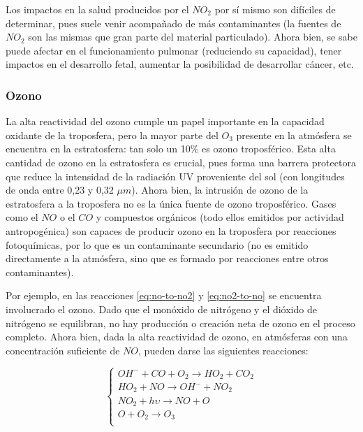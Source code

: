 \documentclass[12pt]{article}
\begin{document}
Los impactos en la salud producidos por el $NO_{2}$ por sí mismo son difíciles de determinar, pues suele venir acompañado de más contaminantes (la fuentes de $NO_{2}$ son las mismas que gran parte del material particulado). Ahora bien, se sabe puede afectar en el funcionamiento pulmonar (reduciendo su capacidad), tener impactos en el desarrollo fetal, aumentar la posibilidad de desarrollar cáncer, etc.

\subsubsection{Ozono}

La alta reactividad del ozono cumple un papel importante en la capacidad oxidante de la troposfera, pero la mayor parte del $O_{3}$ presente en la atmósfera se encuentra en la estratosfera: tan solo un 10\% es ozono troposférico. Esta alta cantidad de ozono en la estratosfera es crucial, pues forma una barrera protectora que reduce la intensidad de la radiación UV proveniente del sol (con longitudes de onda entre 0,23 y 0,32 $\mu m$).  Ahora bien, la intrusión de ozono de la estratosfera a la troposfera no es la única fuente de ozono troposférico. Gases como el $NO$ o el $CO$ y compuestos orgánicos (todo ellos emitidos por actividad antropogénica) son capaces de producir ozono en la troposfera por reacciones fotoquímicas, por lo que es un contaminante secundario (no es emitido directamente a la atmósfera, sino que es formado por reacciones entre otros contaminantes).

Por ejemplo, en las reacciones \ref{eq:no-to-no2} y \ref{eq:no2-to-no} se encuentra involucrado el ozono. Dado que el monóxido de nitrógeno y el dióxido de nitrógeno se equilibran, no hay producción o creación neta de ozono en el proceso completo. Ahora bien, dada la alta reactividad de ozono, en atmósferas con una concentración suficiente de $NO$, pueden darse las siguientes reacciones:

\begin{equation}
\begin{cases}
OH^{-} + CO + O_{2} \rightarrow HO_{2} + CO_{2} \\
HO_{2} + NO \rightarrow OH^{-} + NO_{2} \\
NO_{2} + h\upsilon \rightarrow NO + O \\
O + O_{2} \rightarrow O_{3} \\
\end{cases}
\end{equation}
\end{document}
